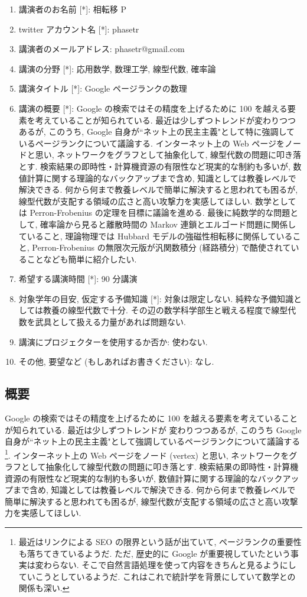 \documentclass[openany, a4paper, oneside]{jsbook}
\begin{document}
\begin{enumerate}
\item 講演者のお名前 [*]: 相転移 P
\item twitter アカウント名 [*]: phasetr
\item 講演者のメールアドレス: phasetr@gmail.com
\item 講演の分野 [*]: 応用数学, 数理工学, 線型代数, 確率論
\item 講演タイトル [*]: Google ページランクの数理
\item 講演の概要 [*]: Google の検索ではその精度を上げるために 100 を越える要素を考えていることが知られている.
最近は少しずつトレンドが変わりつつあるが, このうち,
Google 自身が``ネット上の民主主義"として特に強調しているページランクについて議論する.
インターネット上の Web ページをノードと思い,
ネットワークをグラフとして抽象化して, 線型代数の問題に叩き落とす.
検索結果の即時性・計算機資源の有限性など現実的な制約も多いが,
数値計算に関する理論的なバックアップまで含め, 知識としては教養レベルで解決できる.
何から何まで教養レベルで簡単に解決すると思われても困るが,
線型代数が支配する領域の広さと高い攻撃力を実感してほしい.
数学としては Perron-Frobenius の定理を目標に議論を進める.
最後に純数学的な問題として, 確率論から見ると離散時間の Markov 連鎖とエルゴード問題に関係していること,
理論物理では Hubbard モデルの強磁性相転移に関係していること,
Perron-Frobenius の無限次元版が汎関数積分 (経路積分) で酷使されていることなども簡単に紹介したい.
\item 希望する講演時間 [*]: 90 分講演
\item 対象学年の目安, 仮定する予備知識 [*]: 対象は限定しない.
純粋な予備知識としては教養の線型代数で十分.
その辺の数学科学部生と戦える程度で線型代数を武具として扱える力量があれば問題ない.
\item 講演にプロジェクターを使用するか否か: 使わない.
\item その他, 要望など (もしあればお書きください): なし.
\end{enumerate}
\subsection{概要}

Google の検索ではその精度を上げるために 100 を越える要素を考えていることが知られている.
最近は少しずつトレンドが 変わりつつあるが,
このうち Google 自身が``ネット上の民主主義"として強調しているページランクについて議論する \footnote{最近はリンクによる SEO の限界という話が出ていて,
ページランクの重要性も落ちてきているようだ.
ただ, 歴史的に Google が重要視していたという事実は変わらない.
そこで自然言語処理を使って内容をきちんと見るようにしていこうとしているようだ.
これはこれで統計学を背景にしていて数学との関係も深い.}.
インターネット上の Web ページをノード (vertex) と思い,
ネットワークをグラフとして抽象化して線型代数の問題に叩き落とす.
検索結果の即時性・計算機資源の有限性など現実的な制約も多いが,
数値計算に関する理論的なバックアップまで含め, 知識としては教養レベルで解決できる.
何から何まで教養レベルで簡単に解決すると思われても困るが,
線型代数が支配する領域の広さと高い攻撃力を実感してほしい.
\end{document}

